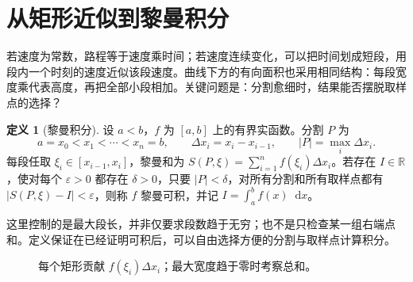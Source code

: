 \documentclass[UTF8,fontset=fandol,12pt,oneside,openany]{ctexrep}
\newcommand{\R}{\mathbb R}
\newcommand{\dd}{\mathop{}\!\mathrm d}
\theoremstyle{definition}
\newtheorem{definition}[theorem]{定义}
\begin{document}
\section{从矩形近似到黎曼积分}
\label{lec:11:riemann}
若速度为常数，路程等于速度乘时间；若速度连续变化，可以把时间划成短段，用段内一个时刻的速度近似该段速度。曲线下方的有向面积也采用相同结构：每段宽度乘代表高度，再把全部小段相加。关键问题是：分割愈细时，结果能否摆脱取样点的选择？
\begin{definition}[黎曼积分]
设 $a<b$，$f$ 为 $[a,b]$ 上的有界实函数。分割 $P$ 为
\[a=x_0<x_1<\cdots<x_n=b,\qquad \Delta x_i=x_i-x_{i-1},\qquad |P|=\max_i\Delta x_i.\]
每段任取 $\xi_i\in[x_{i-1},x_i]$，黎曼和为 $S(P,\xi)=\sum_{i=1}^n f(\xi_i)\Delta x_i$。若存在 $I\in\R$，使对每个 $\varepsilon>0$ 都存在 $\delta>0$，只要 $|P|<\delta$，对所有分割和所有取样点都有 $|S(P,\xi)-I|<\varepsilon$，则称 $f$ 黎曼可积，并记 $I=\int_a^b f(x)\dd x$。
\end{definition}
这里控制的是最大段长，并非仅要求段数趋于无穷；也不是只检查某一组右端点和。定义保证在已经证明可积后，可以自由选择方便的分割与取样点计算积分。
\begin{figure}[htbp]
\centering
{}
\caption{每个矩形贡献 $f(\xi_i)\Delta x_i$；最大宽度趋于零时考察总和。}
\end{figure}
\end{document}

